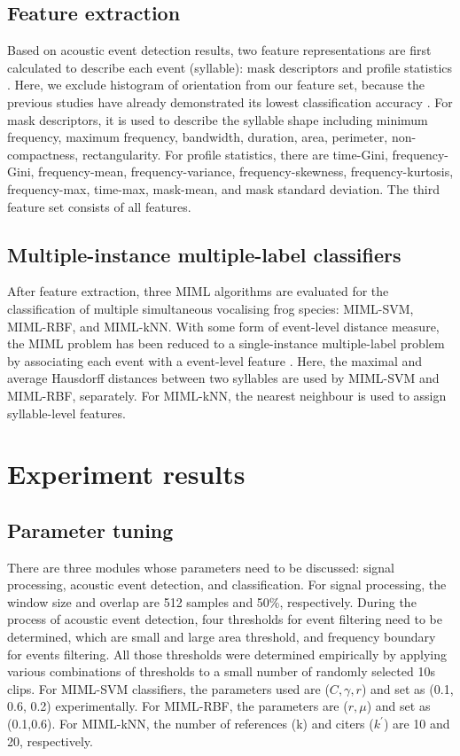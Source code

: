 \subsection{Feature extraction}
Based on acoustic event detection results, two feature representations are first calculated to describe each event (syllable): mask descriptors and profile statistics \cite{briggs2012acoustic}. Here, we exclude histogram of orientation from our feature set, because the previous studies have already demonstrated its lowest classification accuracy \cite{briggs2012acoustic, ruizmultiple2015}. For mask descriptors, it is used to describe the syllable shape including minimum frequency, maximum frequency, bandwidth, duration, area, perimeter, non-compactness, rectangularity. For profile statistics, there are time-Gini, frequency-Gini, frequency-mean, frequency-variance, frequency-skewness, frequency-kurtosis, frequency-max, time-max, mask-mean, and mask standard deviation. The third feature set consists of all features.







\subsection{Multiple-instance multiple-label classifiers}
After feature extraction, three MIML algorithms are evaluated for the classification of multiple simultaneous vocalising frog species: MIML-SVM, MIML-RBF, and MIML-kNN. With some form of event-level distance measure, the MIML problem has been reduced to a single-instance multiple-label problem by associating each event with a event-level feature \cite{briggs2012acoustic}. Here, the maximal and average Hausdorff distances between two syllables are used by MIML-SVM and MIML-RBF, separately. For MIML-kNN, the nearest neighbour is used to assign syllable-level features. 


\section{Experiment results}

\subsection{Parameter tuning}
There are three modules whose parameters need to be discussed: signal processing, acoustic event detection, and classification. For signal processing, the window size and overlap are 512 samples and 50\%, respectively. During the process of acoustic event detection, four thresholds for event filtering need to be determined, which are small and large area threshold, and frequency boundary for events filtering. All those thresholds were determined empirically by applying various combinations of thresholds to a small number of randomly selected 10s clips. For MIML-SVM classifiers, the parameters used are ($C,\gamma,r$) and set as (0.1, 0.6, 0.2) experimentally. For MIML-RBF, the parameters are ($ r, \mu$) and set as (0.1,0.6). For MIML-kNN, the number of references (k) and citers ($k^{'}$) are 10 and 20, respectively.
 
